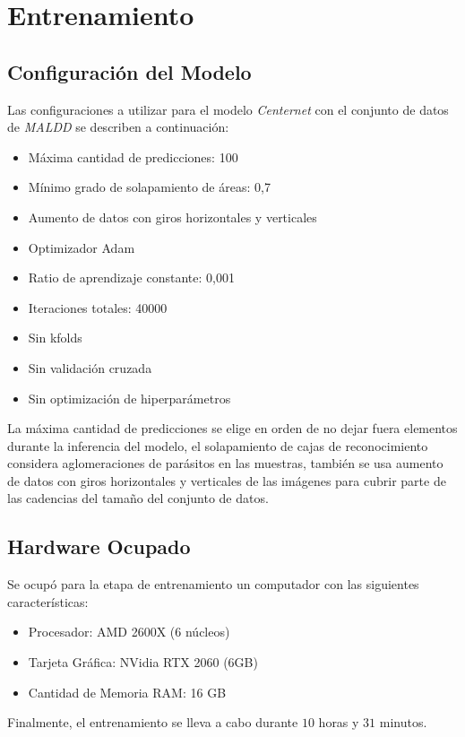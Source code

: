 \documentclass[letter,12pt]{report}
\begin{document}
\chapter{Entrenamiento}\label{entrenamiento}
\section{Configuración del Modelo}
Las configuraciones a utilizar para el modelo \textit{Centernet} con el
conjunto de datos de \textit{MALDD} se describen a continuación:

\begin{itemize}
    \item Máxima cantidad de predicciones: 100
    \item Mínimo grado de solapamiento de áreas: 0,7
    \item Aumento de datos con giros horizontales y verticales
    \item Optimizador Adam
    \item Ratio de aprendizaje constante: 0,001
    \item Iteraciones totales: 40000
    \item Sin kfolds
    \item Sin validación cruzada
    \item Sin optimización de hiperparámetros
\end{itemize}   

La máxima cantidad de predicciones se elige en orden de no dejar fuera
elementos durante la inferencia del modelo, el solapamiento de cajas de
reconocimiento considera aglomeraciones de parásitos en las muestras, también
se usa aumento de datos con giros horizontales y verticales de las imágenes
para cubrir parte de las cadencias del tamaño del conjunto de datos.

\section{Hardware Ocupado}
Se ocupó para la etapa de entrenamiento un computador con las siguientes características:

\begin{itemize}
    \item Procesador: AMD 2600X (6 núcleos)
    \item Tarjeta Gráfica: NVidia RTX 2060 (6GB)
    \item Cantidad de Memoria RAM: 16 GB
\end{itemize}

Finalmente, el entrenamiento se lleva a cabo durante $10$ horas y $31$ minutos.
\end{document}
